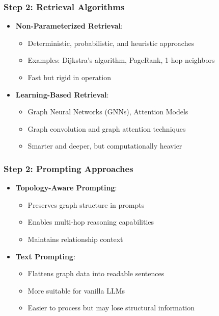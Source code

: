 \begin{frame}[fragile]\frametitle{Step 2: Retrieval Algorithms}
      \begin{itemize}
        \item \textbf{Non-Parameterized Retrieval}:
          \begin{itemize}
            \item Deterministic, probabilistic, and heuristic approaches
            \item Examples: Dijkstra's algorithm, PageRank, 1-hop neighbors
            \item Fast but rigid in operation
          \end{itemize}
        \item \textbf{Learning-Based Retrieval}:
          \begin{itemize}
            \item Graph Neural Networks (GNNs), Attention Models
            \item Graph convolution and graph attention techniques
            \item Smarter and deeper, but computationally heavier
          \end{itemize}
      \end{itemize}
\end{frame}

\begin{frame}[fragile]\frametitle{Step 2: Prompting Approaches}
      \begin{itemize}
        \item \textbf{Topology-Aware Prompting}:
          \begin{itemize}
            \item Preserves graph structure in prompts
            \item Enables multi-hop reasoning capabilities
            \item Maintains relationship context
          \end{itemize}
        \item \textbf{Text Prompting}:
          \begin{itemize}
            \item Flattens graph data into readable sentences
            \item More suitable for vanilla LLMs
            \item Easier to process but may lose structural information
          \end{itemize}
      \end{itemize}
\end{frame}

